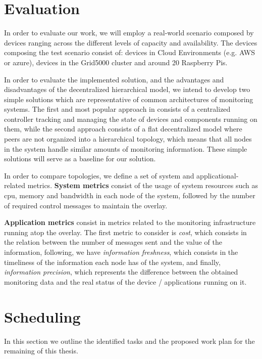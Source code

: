 \section{Evaluation}  

In order to evaluate our work, we will employ a real-world scenario composed by devices ranging across the different levels of capacity and availability. The devices composing the test scenario consist of: devices in Cloud Environments (e.g. AWS or azure), devices in the Grid5000 cluster and around 20 Raspberry Pis.

In order to evaluate the implemented solution, and the advantages and disadvantages of the decentralized hierarchical model, we intend to develop two simple solutions which are representative of common architectures of monitoring systems. The first and most popular approach in consists of a centralized controller tracking and managing the state of devices and components running on them, while the second approach consists of a flat decentralized model where peers are not organized into a hierarchical topology, which means that all nodes in the system handle similar amounts of monitoring information. These simple solutions will serve as a baseline for our solution.

In order to compare topologies, we define a set of system and applicational-related metrics. \textbf{System metrics} consist of the usage of system resources such as cpu, memory and bandwidth in each node of the system, followed by the number of required control messages to maintain the overlay.

\textbf{Application metrics} consist in metrics related to the monitoring infrastructure running atop the overlay. The first metric to consider is \textit{cost}, which consists in the relation between the number of messages sent and the value of the information, following, we have \textit{information freshness}, which consists in the timeliness of the information each node has of the system, and finally, \textit{information precision}, which represents the difference between the obtained monitoring data and the real status of the device / applications running on it.  

\section{Scheduling}

In this section we outline the identified tasks and the proposed work plan for the remaining of this thesis. 

